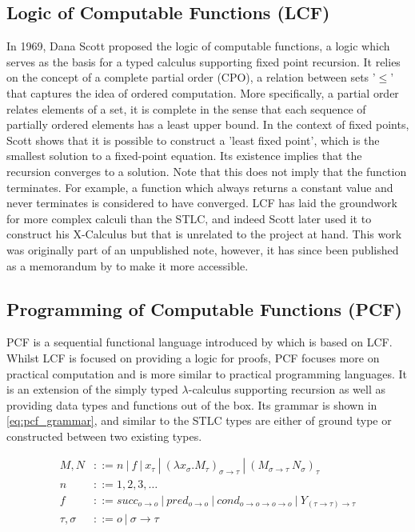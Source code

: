 \documentclass[12pt,a4paper]{report}
\theoremstyle{definition}
\theoremstyle{definition}
\theoremstyle{remark}
\begin{document}
\subsection{Logic of Computable Functions (LCF)}
In 1969, Dana Scott proposed the logic of computable functions, a logic which serves as the basis for a typed calculus supporting fixed point recursion. It relies on the concept of a complete partial order (CPO), a relation between sets '$\leq$' that captures the idea of ordered computation. More specifically, a partial order relates elements of a set, it is complete in the sense that each sequence of partially ordered elements has a least upper bound. In the context of fixed points, Scott shows that it is possible to construct a 'least fixed point', which is the smallest solution to a fixed-point equation. Its existence implies that the recursion converges to a solution. Note that this does not imply that the function terminates. For example, a function which always returns a constant value and never terminates is considered to have converged. LCF has laid the groundwork for more complex calculi than the STLC, and indeed Scott later used it to construct his X-Calculus but that is unrelated to the project at hand. This work was originally part of an unpublished note, however, it has since been published as a memorandum by \cite{milner_1973} to make it more accessible.

\subsection{Programming of Computable Functions (PCF)}
PCF is a sequential functional language introduced by \cite{plotkin_1977} which is based on LCF. Whilst LCF is focused on providing a logic for proofs, PCF focuses more on practical computation and is more similar to practical programming languages. It is an extension of the simply typed $\lambda$-calculus supporting recursion as well as providing data types and functions out of the box. Its grammar is shown in \eqref{eq:pcf_grammar}, and similar to the STLC types are either of ground type or constructed between two existing types.

\begin{equation} \label{eq:pcf_grammar}
\begin{split}
    M,N &::= n\ |\ f\ |\ x_{\tau}\ |\ (\lambda x_{\sigma} .M_{\tau})_{\sigma \rightarrow \tau}\ |\ (M_{\sigma \rightarrow \tau} \ N_{\sigma})_{\tau}\\
    n &::= 1, 2, 3, \dots\\
    f &::= succ_{o \rightarrow o} \ | \ pred_{o \rightarrow o} \ | \ cond_{o \rightarrow o \rightarrow o \rightarrow o} \ | \ Y_{(\tau \rightarrow \tau) \rightarrow \tau}\\
    \tau , \sigma &::= o\ |\ \sigma \rightarrow \tau
\end{split}
\end{equation}
\end{document}
